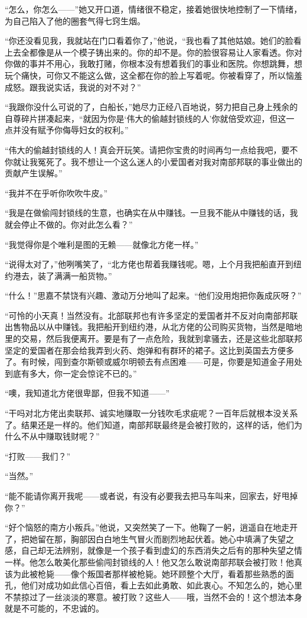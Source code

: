 \par “怎么，你怎么——”她又开口道，情绪很不稳定，接着她很快地控制了一下情绪，为自己陷入了他的圈套气得七窍生烟。
\par “你还没看见我，我就站在门口看着你了，”他说，“我也看了其他姑娘。她们的脸看上去全都像是从一个模子铸出来的。你的却不是。你的脸很容易让人家看透。你对你做的事并不用心，我敢打赌，你根本没有想着我们的事业和医院。你想跳舞，想玩个痛快，可你又不能这么做，这全都在你的脸上写着呢。你被看穿了，所以恼羞成怒。跟我说实话，我说的对不对？”
\par “我跟你没什么可说的了，白船长，”她尽力正经八百地说，努力把自己身上残余的自尊碎片拼凑起来，“就因为你是‘伟大的偷越封锁线的人’你就倍受欢迎，但这一点并没有赋予你侮辱妇女的权利。”
\par “伟大的偷越封锁线的人！真会开玩笑。请把你宝贵的时间再匀一点给我吧，要不你就让我冤死了。我不想让一个这么迷人的小爱国者对我对南部邦联的事业做出的贡献产生误解。”
\par “我并不在乎听你吹吹牛皮。”
\par “我是在做偷闯封锁线的生意，也确实在从中赚钱。一旦我不能从中赚钱的话，我就会停止不做的。你对此怎么看？”
\par “我觉得你是个唯利是图的无赖——就像北方佬一样。”
\par “说得太对了，”他咧嘴笑了，“北方佬也帮着我赚钱呢。嗯，上个月我把船直开到纽约港去，装了满满一船货物。”
\par “什么！”思嘉不禁饶有兴趣、激动万分地叫了起来。“他们没用炮把你轰成灰呀？”
\par “可怜的小天真！当然没有。北部联邦也有许多坚定的爱国者并不反对向南部邦联出售物品以从中赚钱。我把船开到纽约港，从北方佬的公司购买货物，当然是暗地里的交易，然后我便离开。要是有了一点危险，我就到拿骚去，还是这些北部联邦坚定的爱国者在那会给我弄到火药、炮弹和有群环的裙子。这比到英国去方便多了。有时候，闯到查尔斯顿或威尔明顿去有点困难——可是，你要是知道金子用处到底有多大，你一定会惊诧不已的。”
\par “噢，我知道北方佬很卑鄙，但我不知道——”
\par “干吗对北方佬出卖联邦、诚实地赚取一分钱吹毛求疵呢？一百年后就根本没关系了。结果还是一样的。他们知道，南部邦联最终是会被打败的，这样的话，他们为什么不从中赚取钱财呢？”
\par “打败——我们？”
\par “当然。”
\par “能不能请你离开我呢——或者说，有没有必要我去把马车叫来，回家去，好甩掉你？”
\par “好个恼怒的南方小叛兵。”他说，又突然笑了一下。他鞠了一躬，逍遥自在地走开了，把她留在那，胸部因白白地生气冒火而剧烈地起伏着。她心中填满了失望之感，自己却无法辨别，就像是一个孩子看到虚幻的东西消失之后有的那种失望之情一样。他怎么敢美化那些偷闯封锁线的人！他又怎么敢说南部邦联会被打败！他真该为此被枪毙——像个叛国者那样被枪毙。她环顾整个大厅，看着那些熟悉的面孔，他们对成功如此信心百倍，看上去如此勇敢、如此衷心。不知怎么的，她心里不禁掠过了一丝淡淡的寒意。被打败？这些人——哦，当然不会的！这个想法本身就是不可能的，不忠诚的。
